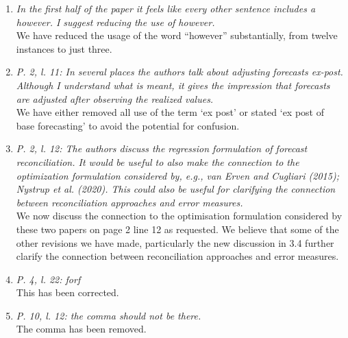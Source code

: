 \documentclass[a4paper,11pt]{article}
\begin{document}
	    \begin{enumerate}
	    
	    \item \textit{In the first half of the paper it feels like every other sentence includes a however. I suggest reducing the use of however.}\\
	    
	    We have reduced the usage of the word ``however'' substantially, from twelve instances to just three.\\
	    
	    \item \textit{P. 2, l. 11: In several places the authors talk about adjusting forecasts ex-post. Although I understand what is meant, it gives the impression that forecasts are adjusted after observing the realized values.}\\
	    
	    We have either removed all use of the term `ex post' or stated `ex post of base forecasting' to avoid the potential for confusion.\\
	    
	    \item \textit{P. 2, l. 12: The authors discuss the regression formulation of forecast reconciliation. It would be useful to also make the connection to the optimization formulation considered by, e.g., van Erven and Cugliari (2015); Nystrup et al. (2020). This could also be useful for clarifying the connection between reconciliation approaches and error measures.}\\
	    
	    We now discuss the connection to the optimisation formulation considered by these two papers on page 2 line 12 as requested.  We believe that some of the other revisions we have made, particularly the new discussion in 3.4 further clarify the connection between reconciliation approaches and error measures.\\
	    
	    \item \textit{P. 4, l. 22: forf}\\
	    
	    This has been corrected.\\
	    
	    \item \textit{P. 10, l. 12: the comma should not be there.}\\
	    
	    The comma has been removed.\\
	    

\end{enumerate}
\end{document}
